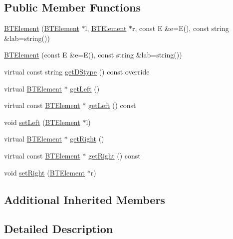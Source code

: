 \subsection*{Public Member Functions}
\begin{DoxyCompactItemize}
\item 
\hyperlink{classbridges_1_1_b_t_element_a8abf38e5d2d70c247de6a6fe6b90bf1b}{B\+T\+Element} (\hyperlink{classbridges_1_1_b_t_element}{B\+T\+Element} $\ast$l, \hyperlink{classbridges_1_1_b_t_element}{B\+T\+Element} $\ast$r, const E \&e=E(), const string \&lab=string())
\item 
\hyperlink{classbridges_1_1_b_t_element_afdc1d11d1d65b23007334d337c279c3a}{B\+T\+Element} (const E \&e=E(), const string \&lab=string())
\item 
virtual const string \hyperlink{classbridges_1_1_b_t_element_a43cc18d2c1e71c399782a306b60e4260}{get\+D\+Stype} () const override
\item 
virtual \hyperlink{classbridges_1_1_b_t_element}{B\+T\+Element} $\ast$ \hyperlink{classbridges_1_1_b_t_element_ab5955c2611b6ae8c3c48508e3e983f87}{get\+Left} ()
\item 
virtual const \hyperlink{classbridges_1_1_b_t_element}{B\+T\+Element} $\ast$ \hyperlink{classbridges_1_1_b_t_element_a01ebba851e9cc6ec77df16201604597a}{get\+Left} () const
\item 
void \hyperlink{classbridges_1_1_b_t_element_a86f58ed6311eeb7eddc76188c423781c}{set\+Left} (\hyperlink{classbridges_1_1_b_t_element}{B\+T\+Element} $\ast$l)
\item 
virtual \hyperlink{classbridges_1_1_b_t_element}{B\+T\+Element} $\ast$ \hyperlink{classbridges_1_1_b_t_element_a931de8a71c04479a4aa0885ecee2a855}{get\+Right} ()
\item 
virtual const \hyperlink{classbridges_1_1_b_t_element}{B\+T\+Element} $\ast$ \hyperlink{classbridges_1_1_b_t_element_ad3b12cd9fa6f3f18fb66c07dbc73a409}{get\+Right} () const
\item 
void \hyperlink{classbridges_1_1_b_t_element_a19cf1ad19b8dd33e0539d77ed7f5c7f6}{set\+Right} (\hyperlink{classbridges_1_1_b_t_element}{B\+T\+Element} $\ast$r)
\end{DoxyCompactItemize}
\subsection*{Additional Inherited Members}


\subsection{Detailed Description}
